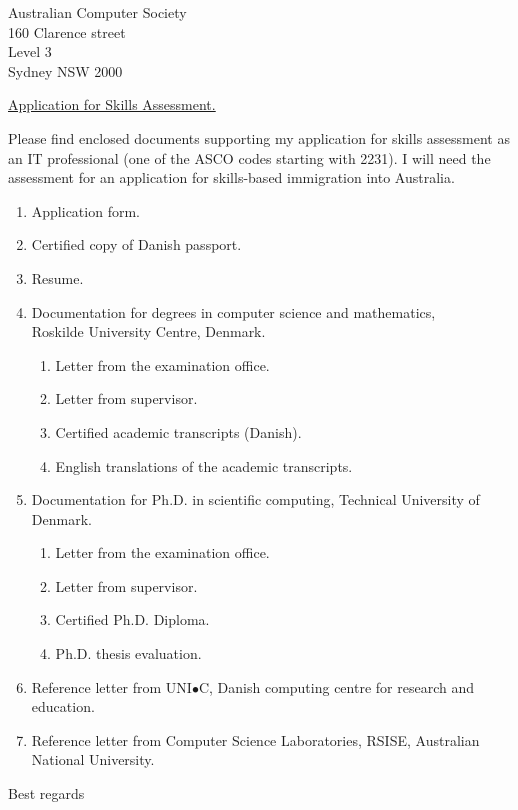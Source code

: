 \documentclass[12pt]{letter}
\begin{document}


\signature{Ole M{\o}ller Nielsen}

\begin{letter}
{Australian Computer Society \\
 160 Clarence street \\
 Level 3 \\
 Sydney NSW 2000}
 
\opening{\underline{Application for Skills Assessment.}}


Please find enclosed documents supporting my application for skills
assessment as an IT professional (one of the ASCO codes starting with 2231).
I will need the assessment for an application for skills-based immigration
into Australia.

\begin{enumerate} 
  \item Application form.
  \item Certified copy of Danish passport.
  \item Resume.
  \item Documentation for degrees in computer science and mathematics,\\  
  Roskilde University Centre, Denmark.
  \begin{enumerate} 
    \item Letter from the examination office.
    \item Letter from supervisor.
    \item Certified academic transcripts (Danish).
    \item English translations of the academic transcripts.
  \end{enumerate}
  \item Documentation for Ph.D. in scientific computing, 
  Technical University of Denmark. 
  \begin{enumerate} 
    \item Letter from the examination office.  
    \item Letter from supervisor.
    \item Certified Ph.D. Diploma.
    \item Ph.D. thesis evaluation.
  \end{enumerate}
  \item Reference letter from UNI$\bullet$C, 
  Danish computing centre for research and education.
  \item Reference letter from Computer Science Laboratories, RSISE, 
  Australian National University.
\end{enumerate}


\vspace{1cm}
\closing{Best regards}

\end{letter}
\end{document}
